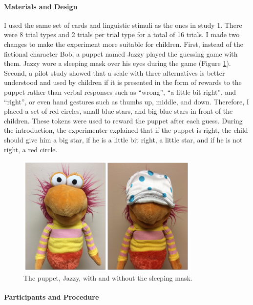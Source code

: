 \documentclass[man]{apa6}
\theoremstyle{definition}
\theoremstyle{definition}
\theoremstyle{definition}
\theoremstyle{remark}
\begin{document}
\paragraph{Materials and Design}\label{materials-and-design-1}

I used the same set of cards and linguistic stimuli as the ones in study
1. There were 8 trial types and 2 trials per trial type for a total of
16 trials. I made two changes to make the experiment more suitable for
children. First, instead of the fictional character Bob, a puppet named
Jazzy played the guessing game with them. Jazzy wore a sleeping mask
over his eyes during the game (Figure \ref{fig:jazzy}). Second, a pilot
study showed that a scale with three alternatives is better understood
and used by children if it is presented in the form of rewards to the
puppet rather than verbal responses such as \enquote{wrong}, \enquote{a
little bit right}, and \enquote{right}, or even hand gestures such as
thumbs up, middle, and down. Therefore, I placed a set of red circles,
small blue stars, and big blue stars in front of the children. These
tokens were used to reward the puppet after each guess. During the
introduction, the experimenter explained that if the puppet is right,
the child should give him a big star, if he is a little bit right, a
little star, and if he is not right, a red circle.

\begin{figure}[tb]

{\centering \includegraphics{figs/jazzy-1} 

}

\caption{The puppet, Jazzy, with and without the sleeping mask.}\label{fig:jazzy}
\end{figure}

\paragraph{Participants and
Procedure}\label{participants-and-procedure-1}
\end{document}
